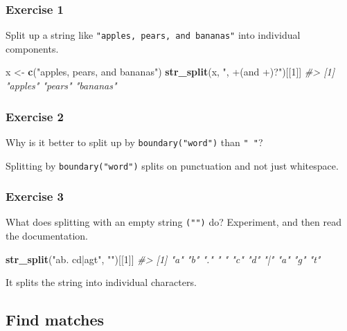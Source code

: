 \documentclass[]{book}
\newenvironment{Shaded}{\begin{snugshade}}{\end{snugshade}}
\newcommand{\CommentTok}[1]{\textcolor[rgb]{0.56,0.35,0.01}{\textit{#1}}}
\newcommand{\DecValTok}[1]{\textcolor[rgb]{0.00,0.00,0.81}{#1}}
\newcommand{\KeywordTok}[1]{\textcolor[rgb]{0.13,0.29,0.53}{\textbf{#1}}}
\newcommand{\NormalTok}[1]{#1}
\newcommand{\StringTok}[1]{\textcolor[rgb]{0.31,0.60,0.02}{#1}}
\theoremstyle{definition}
\theoremstyle{definition}
\theoremstyle{definition}
\theoremstyle{remark}
\begin{document}
\hypertarget{exercise-1-35}{%
\subsubsection{Exercise 1}\label{exercise-1-35}}

Split up a string like \texttt{"apples,\ pears,\ and\ bananas"} into
individual components.

\begin{Shaded}
\begin{Highlighting}[]
\NormalTok{x <-}\StringTok{ }\KeywordTok{c}\NormalTok{(}\StringTok{"apples, pears, and bananas"}\NormalTok{)}
\KeywordTok{str_split}\NormalTok{(x, }\StringTok{", +(and +)?"}\NormalTok{)[[}\DecValTok{1}\NormalTok{]]}
\CommentTok{#> [1] "apples"  "pears"   "bananas"}
\end{Highlighting}
\end{Shaded}

\hypertarget{exercise-2-34}{%
\subsubsection{Exercise 2}\label{exercise-2-34}}

Why is it better to split up by \texttt{boundary("word")} than
\texttt{"\ "}?

Splitting by \texttt{boundary("word")} splits on punctuation and not
just whitespace.

\hypertarget{exercise-3-26}{%
\subsubsection{Exercise 3}\label{exercise-3-26}}

What does splitting with an empty string \texttt{("")} do? Experiment,
and then read the documentation.

\begin{Shaded}
\begin{Highlighting}[]
\KeywordTok{str_split}\NormalTok{(}\StringTok{"ab. cd|agt"}\NormalTok{, }\StringTok{""}\NormalTok{)[[}\DecValTok{1}\NormalTok{]]}
\CommentTok{#>  [1] "a" "b" "." " " "c" "d" "|" "a" "g" "t"}
\end{Highlighting}
\end{Shaded}

It splits the string into individual characters.

\hypertarget{find-matches}{%
\subsection{Find matches}\label{find-matches}}
\end{document}
